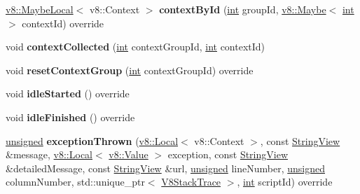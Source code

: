 \begin{DoxyCompactItemize}
\mbox{\label{classv8__inspector_1_1V8InspectorImpl_aacd823c55f1f229757d912271f15d717}} 
\mbox{\hyperlink{classv8_1_1MaybeLocal}{v8\+::\+Maybe\+Local}}$<$ v8\+::\+Context $>$ {\bfseries context\+By\+Id} (\mbox{\hyperlink{classint}{int}} group\+Id, \mbox{\hyperlink{classv8_1_1Maybe}{v8\+::\+Maybe}}$<$ \mbox{\hyperlink{classint}{int}} $>$ context\+Id) override
\item 
\mbox{\label{classv8__inspector_1_1V8InspectorImpl_a402104427324ebe7f6a862d3a52ca0a2}} 
void {\bfseries context\+Collected} (\mbox{\hyperlink{classint}{int}} context\+Group\+Id, \mbox{\hyperlink{classint}{int}} context\+Id)
\item 
\mbox{\label{classv8__inspector_1_1V8InspectorImpl_a91d12fa9b6bbda4582226f37f50b2491}} 
void {\bfseries reset\+Context\+Group} (\mbox{\hyperlink{classint}{int}} context\+Group\+Id) override
\item 
\mbox{\label{classv8__inspector_1_1V8InspectorImpl_af166c90a23e9043005c39098371ba6ab}} 
void {\bfseries idle\+Started} () override
\item 
\mbox{\label{classv8__inspector_1_1V8InspectorImpl_a4745cfd410f837efc12ac478b0641c93}} 
void {\bfseries idle\+Finished} () override
\item 
\mbox{\label{classv8__inspector_1_1V8InspectorImpl_a7e14d76b5b6a95f9a5b8d18911fb980e}} 
\mbox{\hyperlink{classunsigned}{unsigned}} {\bfseries exception\+Thrown} (\mbox{\hyperlink{classv8_1_1Local}{v8\+::\+Local}}$<$ v8\+::\+Context $>$, const \mbox{\hyperlink{classv8__inspector_1_1StringView}{String\+View}} \&message, \mbox{\hyperlink{classv8_1_1Local}{v8\+::\+Local}}$<$ \mbox{\hyperlink{classv8_1_1Value}{v8\+::\+Value}} $>$ exception, const \mbox{\hyperlink{classv8__inspector_1_1StringView}{String\+View}} \&detailed\+Message, const \mbox{\hyperlink{classv8__inspector_1_1StringView}{String\+View}} \&url, \mbox{\hyperlink{classunsigned}{unsigned}} line\+Number, \mbox{\hyperlink{classunsigned}{unsigned}} column\+Number, std\+::unique\+\_\+ptr$<$ \mbox{\hyperlink{classv8__inspector_1_1V8StackTrace}{V8\+Stack\+Trace}} $>$, \mbox{\hyperlink{classint}{int}} script\+Id) override

\end{DoxyCompactItemize}
